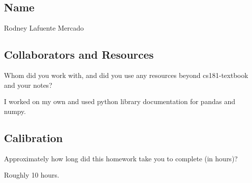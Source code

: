 \documentclass[submit]{harvardml}
\begin{document}
\newpage
\subsection*{Name}

Rodney Lafuente Mercado

\subsection*{Collaborators and Resources}
Whom did you work with, and did you use any resources beyond cs181-textbook and your notes?

I worked on my own and used python library documentation for pandas and numpy.


\subsection*{Calibration}
Approximately how long did this homework take you to complete (in hours)? 

Roughly 10 hours.
\end{document}

